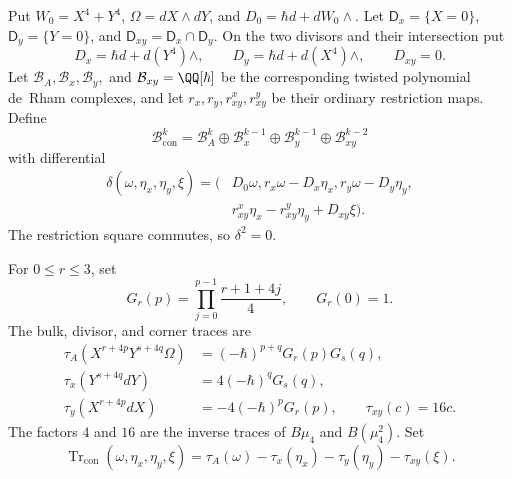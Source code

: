 Put $W_0=X^4+Y^4$, $\Omega=dX\wedge dY$, and
$D_0=\hbar d+dW_0\wedge$.  Let
$\mathsf D_x=\{X=0\}$, $\mathsf D_y=\{Y=0\}$, and
$\mathsf D_{xy}=\mathsf D_x\cap\mathsf D_y$.  On the two divisors and their
intersection put
\[
 D_x=\hbar d+d(Y^4)\wedge,\qquad
 D_y=\hbar d+d(X^4)\wedge,\qquad D_{xy}=0.
\]
Let $\mathcal B_A,\mathcal B_x,\mathcal B_y,$ and
$\mathcal B_{xy}=\QQ[\hbar]$ be the corresponding twisted polynomial
de~Rham complexes, and let $r_x,r_y,r_{xy}^x,r_{xy}^y$ be their ordinary
restriction maps.  Define
\begin{equation}
 \mathcal B_{\mathrm{con}}^k
 =\mathcal B_A^k\oplus\mathcal B_x^{k-1}
  \oplus\mathcal B_y^{k-1}\oplus\mathcal B_{xy}^{k-2}
 \label{eq:des-contact-complex}
\end{equation}
with differential
\begin{equation}
\begin{aligned}
 \delta(\omega,\eta_x,\eta_y,\xi)
 =\bigl(&D_0\omega,r_x\omega-D_x\eta_x,r_y\omega-D_y\eta_y,\\
 &r_{xy}^x\eta_x-r_{xy}^y\eta_y+D_{xy}\xi\bigr).
\end{aligned}
\label{eq:des-contact-differential}
\end{equation}
The restriction square commutes, so $\delta^2=0$.

For $0\leq r\leq3$, set
\begin{equation}
 G_r(p)=\prod_{j=0}^{p-1}\frac{r+1+4j}{4},\qquad G_r(0)=1.
 \label{eq:des-gamma-weight}
\end{equation}
The bulk, divisor, and corner traces are
\begin{equation}
\begin{aligned}
 \tau_A(X^{r+4p}Y^{s+4q}\Omega)&=(-\hbar)^{p+q}G_r(p)G_s(q),\\
 \tau_x(Y^{s+4q}dY)&=4(-\hbar)^qG_s(q),\\
 \tau_y(X^{r+4p}dX)&=-4(-\hbar)^pG_r(p),\qquad
 \tau_{xy}(c)=16c.
\end{aligned}
\label{eq:des-contact-traces}
\end{equation}
The factors $4$ and $16$ are the inverse traces of $B\mu _4$ and
$B(\mu _4^2)$.  Set
\begin{equation}
 \operatorname{Tr}_{\mathrm{con}}(\omega,\eta_x,\eta_y,\xi)
 =\tau_A(\omega)-\tau_x(\eta_x)-\tau_y(\eta_y)-\tau_{xy}(\xi).
 \label{eq:des-total-trace}
\end{equation}

